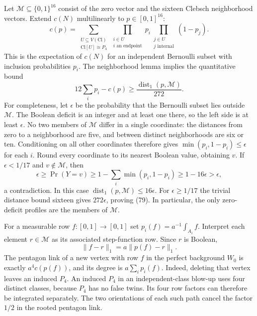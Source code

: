 \documentclass[11pt]{amsart}
\theoremstyle{definition}
\theoremstyle{remark}
\begin{document}
Let $\mathcal M\subseteq\{0,1\}^{16}$ consist of the zero vector and
the sixteen Clebsch neighborhood vectors. Extend $c(N)$ multilinearly
to $p\in[0,1]^{16}$:
\[
 c(p)=\sum_{\substack{U\subseteq V(\mathrm{Cl})\\
                      \mathrm{Cl}[U]\cong P_4}}
       \prod_{\substack{i\in U\\i\text{ an endpoint}}}p_i
       \prod_{\substack{j\in U\\j\text{ internal}}}(1-p_j).
\]
This is the expectation of $c(N)$ for an independent Bernoulli subset
with inclusion probabilities $p_i$. The neighborhood lemma implies
the quantitative bound
\begin{equation}\tag{79}\label{eq:fractional-profile-distance}
 12\sum_i p_i-c(p)\geq\frac{\operatorname{dist}_1(p,\mathcal M)}{272}.
\end{equation}
For completeness, let $\epsilon$ be the probability that the Bernoulli
subset lies outside $\mathcal M$. The Boolean deficit is an integer
and at least one there, so the left side is at least $\epsilon$. No
two members of $\mathcal M$ differ in a single coordinate: the
distances from zero to a neighborhood are five, and between distinct
neighborhoods are six or ten. Conditioning on all other coordinates
therefore gives $\min(p_i,1-p_i)\leq\epsilon$ for each $i$. Round
every coordinate to its nearest Boolean value, obtaining $v$. If
$\epsilon<1/17$ and $v\notin\mathcal M$, then
\[
 \epsilon\geq\Pr(Y=v)
 \geq1-\sum_i\min(p_i,1-p_i)\geq1-16\epsilon>\epsilon,
\]
a contradiction. In this case
$\operatorname{dist}_1(p,\mathcal M)\leq16\epsilon$. For
$\epsilon\geq1/17$ the trivial distance bound sixteen gives
$272\epsilon$, proving (79). In particular, the only zero-deficit
profiles are the members of $\mathcal M$.

For a measurable row $f:[0,1]\to[0,1]$ set
$p_i(f)=a^{-1}\int_{A_i}f$. Interpret each element $r\in\mathcal M$
as its associated step-function row. Since $r$ is Boolean,
\begin{equation}\tag{80}\label{eq:row-profile-distance}
 \lVert f-r\rVert_1=a\lVert p(f)-r\rVert_1.
\end{equation}
The pentagon link of a new vertex with row $f$ in the perfect
background $W_0$ is exactly $a^4c(p(f))$, and its degree is
$a\sum_i p_i(f)$. Indeed, deleting that vertex leaves an induced
$P_4$. An induced $P_4$ in an independent-class blow-up uses four
distinct classes, because $P_4$ has no false twins. Its four row
factors can therefore be integrated separately. The two orientations
of each such path cancel the factor $1/2$ in the rooted pentagon link.
\end{document}

